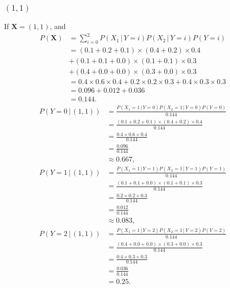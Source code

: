 \documentclass[10pt]{article}
\begin{document}
\subsubsection*{$(1, 1)$}
If $\textbf{X} = (1, 1)$, and
\begin{align*}
P(\textbf{X}) &= \sum_{i = 0}^2 P(X_1 \, | \, Y = i)P(X_2 \, | \, Y = i)P(Y = i) \\
             &= (0.1 + 0.2 + 0.1) \times (0.4 + 0.2) \times 0.4 \\
             &+ (0.1 + 0.1 + 0.0) \times (0.1 + 0.1) \times 0.3 \\
             &+ (0.4 + 0.0 + 0.0) \times (0.3 + 0.0) \times 0.3 \\
             &= 0.4 \times 0.6 \times 0.4 + 0.2 \times 0.2 \times 0.3 + 0.4 \times 0.3 \times 0.3 \\
			 &= 0.096 + 0.012 + 0.036 \\
			 &= 0.144.
\end{align*}
\begin{align*}
P(Y = 0 \, | \, (1, 1)) &= \frac{P(X_1= 1 \, | \, Y = 0)P(X_2 = 1 \, | \, Y = 0)P(Y = 0)}{ 0.144 } \\
     &= \frac{ (0.1 + 0.2 + 0.1) \times (0.4 + 0.2) \times 0.4 }{ 0.144 } \\
     &= \frac{ 0.4 \times 0.6 \times 0.4 }{ 0.144 } \\
     &= \frac{ 0.096 }{ 0.144 } \\
     &\approx 0.667,
\end{align*}
\begin{align*}
P(Y = 1 \, | \, (1, 1)) &= \frac{ P(X_1 = 1 \, | \, Y = 1)P(X_2 = 1 \, | \,  Y = 1)P(Y = 1)}{ 0.144 } \\
     &= \frac{ (0.1 + 0.1 + 0.0) \times (0.1 + 0.1) \times 0.3 }{ 0.144 } \\
     &= \frac{ 0.2 \times 0.2 \times 0.3 }{ 0.144 } \\
     &= \frac{ 0.012 }{ 0.144 } \\
     &\approx 0.083,
\end{align*}
\begin{align*}
P(Y = 2 \, | \, (1, 1)) &= \frac{ P(X_1 = 1 \, | \, Y = 2)P(X_2 = 1 \, | \, Y = 2)P(Y = 2) }{ 0.144 } \\
     &= \frac{ (0.4 + 0.0 + 0.0) \times (0.3 + 0.0) \times 0.3 }{ 0.144 } \\
     &= \frac{ 0.4 \times 0.3 \times 0.3}{ 0.144 } \\
     &= \frac{ 0.036 }{ 0.144 } \\
     &= 0.25.
\end{align*}
\end{document}
